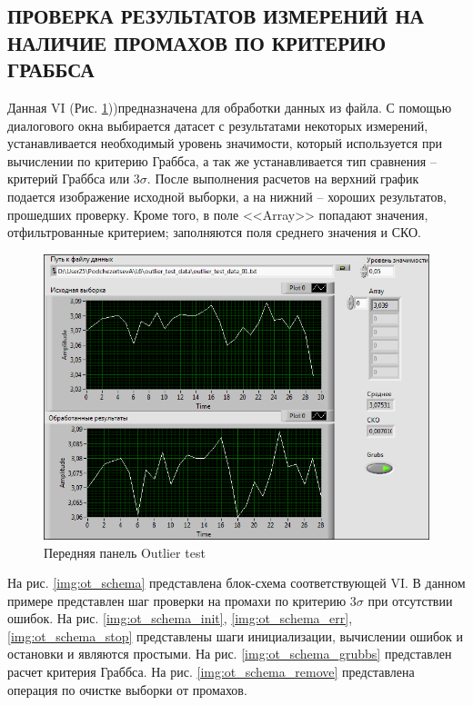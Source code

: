 \documentclass[a4paper,14pt]{article}
\begin{document}
\subsection{ПРОВЕРКА РЕЗУЛЬТАТОВ ИЗМЕРЕНИЙ НА НАЛИЧИЕ ПРОМАХОВ ПО КРИТЕРИЮ ГРАББСА}

Данная VI (Рис. \ref{img:ot_vi}))предназначена для обработки данных из файла.
С помощью диалогового окна выбирается датасет с результатами некоторых измерений, устанавливается необходимый уровень значимости, который используется при вычислении по критерию Граббса, а так же устанавливается тип сравнения -- критерий Граббса или $3\sigma$.
После выполнения расчетов на верхний график подается изображение исходной выборки, а на нижний -- хороших результатов, прошедших проверку.
Кроме того, в поле <<Array>> попадают значения, отфильтрованные критерием; заполняются поля среднего значения и СКО.

\begin{figure}[H]
    \centering
    \includegraphics[width=\linewidth]{image/ot_vi}
    \caption{Передняя панель Outlier test}\label{img:ot_vi}
\end{figure}

На рис. \ref{img:ot_schema} представлена блок-схема соответствующей VI.
В данном примере представлен шаг проверки на промахи по критерию $3\sigma$ при отсутствии ошибок.
На рис. \ref{img:ot_schema_init}, \ref{img:ot_schema_err}, \ref{img:ot_schema_stop} представлены шаги инициализации, вычислении ошибок и остановки и являются простыми.
На рис. \ref{img:ot_schema_grubbs} представлен расчет критерия Граббса.
На рис. \ref{img:ot_schema_remove} представлена операция по очистке выборки от промахов.
\end{document}

